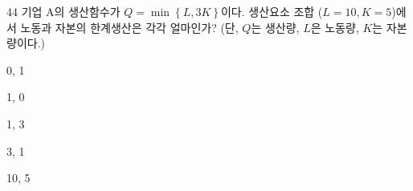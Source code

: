 \begin{question}{44}
기업 A의 생산함수가 ${ Q=\min \left\{ L, 3K \right\} }$이다. 생산요소 조합 (${ L=10, K=5 }$)에서 노동과 자본의 한계생산은 각각 얼마인가? (단, ${ Q }$는 생산량, ${ L }$은 노동량, ${ K }$는 자본량이다.)
\begin{choices}
  \item 0, 1
  \item 1, 0
  \item 1, 3
  \item 3, 1
  \item 10, 5
\end{choices}
\end{question}

